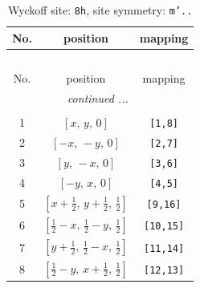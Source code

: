 \documentclass[fleqn,8pt]{jsarticle}
\begin{document}
\begin{longtable}{ccc}
\caption{Wyckoff site: {\tt 8h}, site symmetry: {\tt m'..}}
 \\
 \hline \hline
No. & position & mapping \\ \hline \endfirsthead

\multicolumn{2}{l}{\tablename\ \thetable{}} \\
 \hline \hline
No. & position & mapping \\ \hline \endhead

 \hline \hline
\multicolumn{2}{r}{\footnotesize\it continued ...} \\ \endfoot

 \hline \hline
\multicolumn{2}{r}{} \\ \endlastfoot

1 & $\left[ x,\, y,\, 0 \right]$ & {\tt [1,8]} \\ \hline
2 & $\left[ - x,\, - y,\, 0 \right]$ & {\tt [2,7]} \\ \hline
3 & $\left[ y,\, - x,\, 0 \right]$ & {\tt [3,6]} \\ \hline
4 & $\left[ - y,\, x,\, 0 \right]$ & {\tt [4,5]} \\ \hline
5 & $\left[ x + \frac{1}{2},\, y + \frac{1}{2},\, \frac{1}{2} \right]$ & {\tt [9,16]} \\ \hline
6 & $\left[ \frac{1}{2} - x,\, \frac{1}{2} - y,\, \frac{1}{2} \right]$ & {\tt [10,15]} \\ \hline
7 & $\left[ y + \frac{1}{2},\, \frac{1}{2} - x,\, \frac{1}{2} \right]$ & {\tt [11,14]} \\ \hline
8 & $\left[ \frac{1}{2} - y,\, x + \frac{1}{2},\, \frac{1}{2} \right]$ & {\tt [12,13]} \\
\end{longtable}
\renewcommand{\arraystretch}{1.2}
\end{document}
